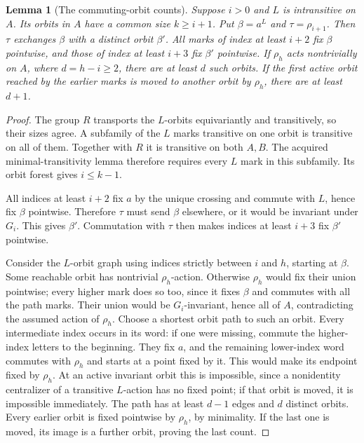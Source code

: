\documentclass[11pt,a4paper]{article}
\newtheorem{lemma}{Lemma}
\begin{document}
\begin{lemma}[The commuting-orbit counts]\label{orbits}
Suppose $i>0$ and $L$ is intransitive on $A$. Its orbits in
$A$ have a common size $k\ge i+1$. Put $\beta=a^L$ and
$\tau=\rho_{i+1}$. Then $\tau$ exchanges $\beta$ with a
distinct orbit $\beta'$. All marks of index at least $i+2$
fix $\beta$ pointwise, and those of index at least $i+3$
fix $\beta'$ pointwise.
If $\rho_h$ acts nontrivially on $A$, where $d=h-i\ge2$,
there are at least $d$ such orbits. If the first active orbit
reached by the earlier marks is moved to another orbit by
$\rho_h$, there are at least $d+1$.
\end{lemma}
\begin{proof}
The group $R$ transports the $L$-orbits equivariantly and
transitively, so their sizes agree. A subfamily of the $L$
marks transitive on one orbit is transitive on all of them.
Together with $R$ it is transitive on both $A,B$. The acquired
minimal-transitivity lemma therefore requires every $L$ mark
in this subfamily. Its orbit forest gives $i\le k-1$.

All indices at least $i+2$ fix $a$ by the unique crossing
and commute with $L$, hence fix $\beta$ pointwise. Therefore
$\tau$ must send $\beta$ elsewhere, or it would be invariant
under $G_i$. This gives $\beta'$. Commutation with $\tau$
then makes indices at least $i+3$ fix $\beta'$ pointwise.

Consider the $L$-orbit graph using indices strictly between
$i$ and $h$, starting at $\beta$. Some reachable orbit has
nontrivial $\rho_h$-action. Otherwise $\rho_h$ would fix
their union pointwise; every higher mark does so too, since
it fixes $\beta$ and commutes with all the path marks. Their
union would be $G_i$-invariant, hence all of $A$, contradicting
the assumed action of $\rho_h$.
Choose a shortest orbit path to such an orbit. Every intermediate
index occurs in its word: if one were missing, commute the
higher-index letters to the beginning. They fix $a$, and
the remaining lower-index word commutes with $\rho_h$ and
starts at a point fixed by it. This would make its endpoint
fixed by $\rho_h$. At an active invariant orbit this is
impossible, since a nonidentity centralizer of a transitive
$L$-action has no fixed point; if that orbit is moved, it
is impossible immediately. The path has at least $d-1$
edges and $d$ distinct orbits. Every earlier orbit is fixed
pointwise by $\rho_h$, by minimality. If the last one is
moved, its image is a further orbit, proving the last count.
\end{proof}
\end{document}
